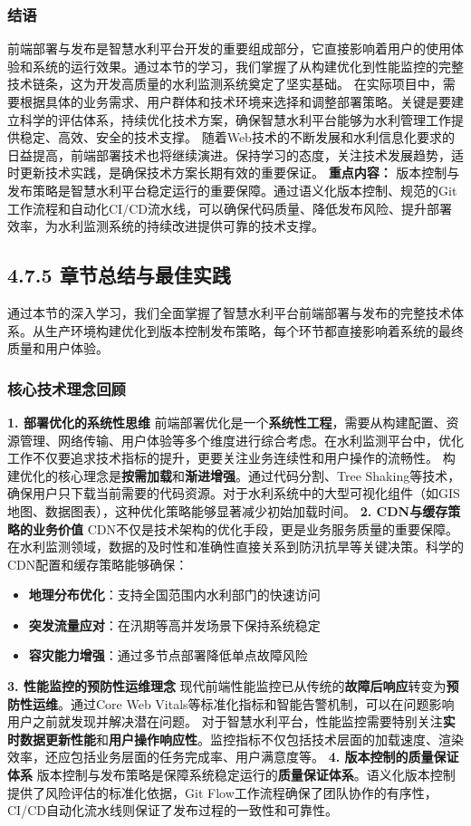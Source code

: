 \subsubsection{结语}\label{ux7ed3ux8bed}
前端部署与发布是智慧水利平台开发的重要组成部分，它直接影响着用户的使用体验和系统的运行效果。通过本节的学习，我们掌握了从构建优化到性能监控的完整技术链条，这为开发高质量的水利监测系统奠定了坚实基础。
在实际项目中，需要根据具体的业务需求、用户群体和技术环境来选择和调整部署策略。关键是要建立科学的评估体系，持续优化技术方案，确保智慧水利平台能够为水利管理工作提供稳定、高效、安全的技术支撑。
随着Web技术的不断发展和水利信息化要求的日益提高，前端部署技术也将继续演进。保持学习的态度，关注技术发展趋势，适时更新技术实践，是确保技术方案长期有效的重要保证。 \textbf{重点内容：}
版本控制与发布策略是智慧水利平台稳定运行的重要保障。通过语义化版本控制、规范的Git工作流程和自动化CI/CD流水线，可以确保代码质量、降低发布风险、提升部署效率，为水利监测系统的持续改进提供可靠的技术支撑。
\subsection{4.7.5 章节总结与最佳实践}\label{ux7ae0ux8282ux603bux7ed3ux4e0eux6700ux4f73ux5b9eux8df5-1}
通过本节的深入学习，我们全面掌握了智慧水利平台前端部署与发布的完整技术体系。从生产环境构建优化到版本控制发布策略，每个环节都直接影响着系统的最终质量和用户体验。
\subsubsection{核心技术理念回顾}\label{ux6838ux5fc3ux6280ux672fux7406ux5ff5ux56deux987e} \textbf{1. 部署优化的系统性思维}
前端部署优化是一个\textbf{系统性工程}，需要从构建配置、资源管理、网络传输、用户体验等多个维度进行综合考虑。在水利监测平台中，优化工作不仅要追求技术指标的提升，更要关注业务连续性和用户操作的流畅性。
构建优化的核心理念是\textbf{按需加载}和\textbf{渐进增强}。通过代码分割、Tree
Shaking等技术，确保用户只下载当前需要的代码资源。对于水利系统中的大型可视化组件（如GIS地图、数据图表），这种优化策略能够显著减少初始加载时间。 \textbf{2. CDN与缓存策略的业务价值}
CDN不仅是技术架构的优化手段，更是业务服务质量的重要保障。在水利监测领域，数据的及时性和准确性直接关系到防汛抗旱等关键决策。科学的CDN配置和缓存策略能够确保： \begin{itemize} \tightlist \item
\textbf{地理分布优化}：支持全国范围内水利部门的快速访问 \item \textbf{突发流量应对}：在汛期等高并发场景下保持系统稳定 \item \textbf{容灾能力增强}：通过多节点部署降低单点故障风险
\end{itemize} \textbf{3. 性能监控的预防性运维理念} 现代前端性能监控已从传统的\textbf{故障后响应}转变为\textbf{预防性运维}。通过Core Web
Vitals等标准化指标和智能告警机制，可以在问题影响用户之前就发现并解决潜在问题。
对于智慧水利平台，性能监控需要特别关注\textbf{实时数据更新性能}和\textbf{用户操作响应性}。监控指标不仅包括技术层面的加载速度、渲染效率，还应包括业务层面的任务完成率、用户满意度等。 \textbf{4.
版本控制的质量保证体系} 版本控制与发布策略是保障系统稳定运行的\textbf{质量保证体系}。语义化版本控制提供了风险评估的标准化依据，Git
Flow工作流程确保了团队协作的有序性，CI/CD自动化流水线则保证了发布过程的一致性和可靠性。

